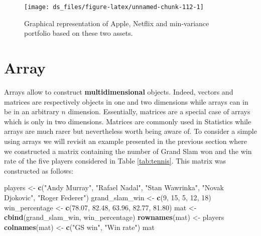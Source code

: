\documentclass[12pt,]{krantz}
\newenvironment{Shaded}{\begin{snugshade}}{\end{snugshade}}
\newcommand{\KeywordTok}[1]{\textcolor[rgb]{0.27,0.27,0.27}{\textbf{#1}}}
\newcommand{\DecValTok}[1]{\textcolor[rgb]{0.06,0.06,0.06}{#1}}
\newcommand{\FloatTok}[1]{\textcolor[rgb]{0.06,0.06,0.06}{#1}}
\newcommand{\StringTok}[1]{\textcolor[rgb]{0.5,0.5,0.5}{#1}}
\newcommand{\NormalTok}[1]{#1}
\begin{document}
\begin{figure}

{\centering \texttt{[image: ds\_files/figure-latex/unnamed-chunk-112-1]} 

}

\caption{Graphical representation of Apple, Netflix and min-variance portfolio based on these two assets.}\label{fig:unnamed-chunk-112}
\end{figure}

\section{Array}\label{array}

Arrays allow to construct \textbf{multidimensional} objects. Indeed,
vectors and matrices are respectively objects in one and two dimensions
while arrays can in be in an arbitrary \(n\) dimension. Essentially,
matrices are a special case of arrays which is only in two dimensions.
Matrices are commonly used in Statistics while arrays are much rarer but
nevertheless worth being aware of. To consider a simple using arrays we
will revisit an example presented in the previous section where we
constructed a matrix containing the number of Grand Slam won and the win
rate of the five players considered in Table \ref{tab:tennis}. This
matrix was constructed as follows:

\begin{Shaded}
\begin{Highlighting}[]
\NormalTok{players <-}\StringTok{ }\KeywordTok{c}\NormalTok{(}\StringTok{"Andy Murray"}\NormalTok{, }\StringTok{"Rafael Nadal"}\NormalTok{, }\StringTok{"Stan Wawrinka"}\NormalTok{, }
             \StringTok{"Novak Djokovic"}\NormalTok{, }\StringTok{"Roger Federer"}\NormalTok{)}
\NormalTok{grand_slam_win <-}\StringTok{ }\KeywordTok{c}\NormalTok{(}\DecValTok{9}\NormalTok{, }\DecValTok{15}\NormalTok{, }\DecValTok{5}\NormalTok{, }\DecValTok{12}\NormalTok{, }\DecValTok{18}\NormalTok{)}
\NormalTok{win_percentage <-}\StringTok{ }\KeywordTok{c}\NormalTok{(}\FloatTok{78.07}\NormalTok{, }\FloatTok{82.48}\NormalTok{, }\FloatTok{63.96}\NormalTok{, }\FloatTok{82.77}\NormalTok{, }\FloatTok{81.80}\NormalTok{)}
\NormalTok{mat <-}\StringTok{ }\KeywordTok{cbind}\NormalTok{(grand_slam_win, win_percentage)}
\KeywordTok{rownames}\NormalTok{(mat) <-}\StringTok{ }\NormalTok{players}
\KeywordTok{colnames}\NormalTok{(mat) <-}\StringTok{ }\KeywordTok{c}\NormalTok{(}\StringTok{"GS win"}\NormalTok{, }\StringTok{"Win rate"}\NormalTok{)}
\NormalTok{mat}
\end{Highlighting}
\end{Shaded}
\end{document}
